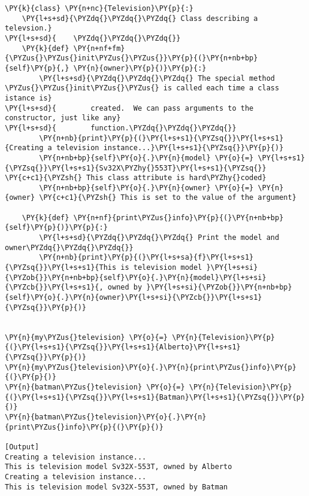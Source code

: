 \begin{Verbatim}[label=\makebox{\url{https://github.com/lucabaldini/cmepda/tree/master/slides/latex/snippets/class\_constructor.py}},commandchars=\\\{\}]
\PY{k}{class} \PY{n+nc}{Television}\PY{p}{:}
    \PY{l+s+sd}{\PYZdq{}\PYZdq{}\PYZdq{} Class describing a televsion.}
\PY{l+s+sd}{    \PYZdq{}\PYZdq{}\PYZdq{}}
    \PY{k}{def} \PY{n+nf+fm}{\PYZus{}\PYZus{}init\PYZus{}\PYZus{}}\PY{p}{(}\PY{n+nb+bp}{self}\PY{p}{,} \PY{n}{owner}\PY{p}{)}\PY{p}{:}
        \PY{l+s+sd}{\PYZdq{}\PYZdq{}\PYZdq{} The special method \PYZus{}\PYZus{}init\PYZus{}\PYZus{} is called each time a class istance is}
\PY{l+s+sd}{        created.  We can pass arguments to the constructor, just like any}
\PY{l+s+sd}{        function.\PYZdq{}\PYZdq{}\PYZdq{}}
        \PY{n+nb}{print}\PY{p}{(}\PY{l+s+s1}{\PYZsq{}}\PY{l+s+s1}{Creating a television instance...}\PY{l+s+s1}{\PYZsq{}}\PY{p}{)}
        \PY{n+nb+bp}{self}\PY{o}{.}\PY{n}{model} \PY{o}{=} \PY{l+s+s1}{\PYZsq{}}\PY{l+s+s1}{Sv32X\PYZhy{}553T}\PY{l+s+s1}{\PYZsq{}} \PY{c+c1}{\PYZsh{} This class attribute is hard\PYZhy{}coded}
        \PY{n+nb+bp}{self}\PY{o}{.}\PY{n}{owner} \PY{o}{=} \PY{n}{owner} \PY{c+c1}{\PYZsh{} This is set to the value of the argument}

    \PY{k}{def} \PY{n+nf}{print\PYZus{}info}\PY{p}{(}\PY{n+nb+bp}{self}\PY{p}{)}\PY{p}{:}
        \PY{l+s+sd}{\PYZdq{}\PYZdq{}\PYZdq{} Print the model and owner\PYZdq{}\PYZdq{}\PYZdq{}}
        \PY{n+nb}{print}\PY{p}{(}\PY{l+s+sa}{f}\PY{l+s+s1}{\PYZsq{}}\PY{l+s+s1}{This is television model }\PY{l+s+si}{\PYZob{}}\PY{n+nb+bp}{self}\PY{o}{.}\PY{n}{model}\PY{l+s+si}{\PYZcb{}}\PY{l+s+s1}{, owned by }\PY{l+s+si}{\PYZob{}}\PY{n+nb+bp}{self}\PY{o}{.}\PY{n}{owner}\PY{l+s+si}{\PYZcb{}}\PY{l+s+s1}{\PYZsq{}}\PY{p}{)}


\PY{n}{my\PYZus{}television} \PY{o}{=} \PY{n}{Television}\PY{p}{(}\PY{l+s+s1}{\PYZsq{}}\PY{l+s+s1}{Alberto}\PY{l+s+s1}{\PYZsq{}}\PY{p}{)}
\PY{n}{my\PYZus{}television}\PY{o}{.}\PY{n}{print\PYZus{}info}\PY{p}{(}\PY{p}{)}
\PY{n}{batman\PYZus{}television} \PY{o}{=} \PY{n}{Television}\PY{p}{(}\PY{l+s+s1}{\PYZsq{}}\PY{l+s+s1}{Batman}\PY{l+s+s1}{\PYZsq{}}\PY{p}{)}
\PY{n}{batman\PYZus{}television}\PY{o}{.}\PY{n}{print\PYZus{}info}\PY{p}{(}\PY{p}{)}

[Output]
Creating a television instance...
This is television model Sv32X-553T, owned by Alberto
Creating a television instance...
This is television model Sv32X-553T, owned by Batman
\end{Verbatim}